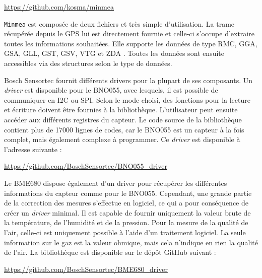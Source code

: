\begin{center}
    \url{https://github.com/kosma/minmea}
\end{center}

\texttt{Minmea} est composée de deux fichiers et très simple d'utilisation. La trame récupérée depuis le GPS lui est directement fournie et celle-ci s'occupe d'extraire toutes les informations souhaitées. Elle supporte les données de type RMC, GGA, GSA, GLL, GST, GSV, VTG et ZDA \cite{NMEAdata3:online}. Toutes les données sont ensuite accessibles via des structures selon le type de données.

\label{sec-softwaire_driver_bno}

Bosch Sensortec fournit différents drivers pour la plupart de ses composants. Un \textit{driver} est disponible pour le BNO055, avec lesquels, il est possible de communiquer en I2C ou SPI. Selon le mode choisi, des fonctions pour la lecture et écriture doivent être fournies à la bibliothèque. L'utilisateur peut ensuite accéder aux différents registres du capteur.
Le code source de la bibliothèque contient plus de 17000 lignes de codes, car le BNO055 est un capteur à la fois complet, mais également complexe à programmer. Ce \textit{driver} est disponible à l'adresse suivante : 
\begin{center}
    \url{https://github.com/BoschSensortec/BNO055_driver}
\end{center}

\label{sec-softwaire_driver_bme680}

Le BME680 dispose également d'un driver pour récupérer les différentes informations du capteur comme pour le BNO055. Cependant, une grande partie de la correction des mesures s'effectue en logiciel, ce qui a pour conséquence de créer un \textit{driver} minimal. Il est capable de fournir uniquement la valeur brute de la température, de l'humidité et de la pression. Pour la mesure de la qualité de l'air, celle-ci est uniquement possible à l'aide d'un traitement logiciel. La seule information sur le gaz est la valeur ohmique, mais cela n'indique en rien la qualité de l'air. La bibliothèque est disponible sur le dépôt GitHub suivant : 
\begin{center}
    \url{https://github.com/BoschSensortec/BME680_driver}
\end{center}

\label{sec-software_bme680_bsec}

